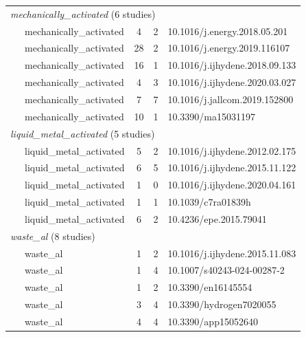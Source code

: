 \begin{table}[htbp]
\begin{tabular}{llccp{5.5cm}}
\midrule
\multicolumn{5}{l}{\textit{mechanically\_activated} (6 studies)} \\
\citeauthor{xiao2018}~\cite{xiao2018}          & mechanically\_activated & 4 & 2 & 10.1016/j.energy.2018.05.201 \\
\citeauthor{guan2019}~\cite{guan2019}          & mechanically\_activated & 28 & 2 & 10.1016/j.energy.2019.116107 \\
\citeauthor{preez2018}~\cite{preez2018}        & mechanically\_activated & 16 & 1 & 10.1016/j.ijhydene.2018.09.133 \\
\citeauthor{chen2020}~\cite{chen2020}          & mechanically\_activated & 4 & 3 & 10.1016/j.ijhydene.2020.03.027 \\
\citeauthor{xiao2020}~\cite{xiao2020}          & mechanically\_activated & 7 & 7 & 10.1016/j.jallcom.2019.152800 \\
\citeauthor{davies2022mat}~\cite{davies2022mat}& mechanically\_activated & 10 & 1 & 10.3390/ma15031197 \\
\midrule
\multicolumn{5}{l}{\textit{liquid\_metal\_activated} (5 studies)} \\
\citeauthor{ilyukhina2012}~\cite{ilyukhina2012}& liquid\_metal\_activated & 5 & 2 & 10.1016/j.ijhydene.2012.02.175 \\
\citeauthor{dudoladov2016}~\cite{dudoladov2016}& liquid\_metal\_activated & 6 & 5 & 10.1016/j.ijhydene.2015.11.122 \\
\citeauthor{fischman2020}~\cite{fischman2020}  & liquid\_metal\_activated & 1 & 0 & 10.1016/j.ijhydene.2020.04.161 \\
\citeauthor{lu2017}~\cite{lu2017}              & liquid\_metal\_activated & 1 & 1 & 10.1039/c7ra01839h \\
\citeauthor{jayaraman2015}~\cite{jayaraman2015}& liquid\_metal\_activated & 6 & 2 & 10.4236/epe.2015.79041 \\
\midrule
\multicolumn{5}{l}{\textit{waste\_al} (8 studies)} \\
\citeauthor{ho2016}~\cite{ho2016}              & waste\_al & 1 & 2 & 10.1016/j.ijhydene.2015.11.083 \\
\citeauthor{gupta2025}~\cite{gupta2025}        & waste\_al & 1 & 4 & 10.1007/s40243-024-00287-2 \\
\citeauthor{mezulis2023}~\cite{mezulis2023}    & waste\_al & 1 & 2 & 10.3390/en16145554 \\
\citeauthor{martinezv2026}~\cite{martinezv2026}& waste\_al & 3 & 4 & 10.3390/hydrogen7020055 \\
\citeauthor{knoks2025}~\cite{knoks2025}        & waste\_al & 4 & 4 & 10.3390/app15052640 \\

\end{tabular}
\end{table}
